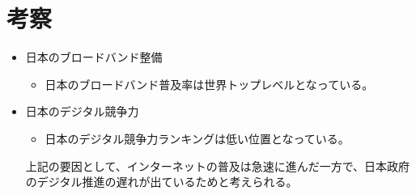 \documentclass[a4paper,11pt,dvipdfmx]{ujarticle}
\begin{document}
\section{考察}
%
\begin{itemize}
    \item 日本のブロードバンド整備
    \begin{itemize}
        \item 日本のブロードバンド普及率は世界トップレベルとなっている。
    \end{itemize}
\end{itemize}
\begin{itemize}
    \item 日本のデジタル競争力
    \begin{itemize}
        \item 日本のデジタル競争力ランキングは低い位置となっている。    
    \end{itemize}
    上記の要因として、インターネットの普及は急速に進んだ一方で、日本政府のデジタル推進の遅れが出ているためと考えられる。
\end{itemize}

%


\end{document}
